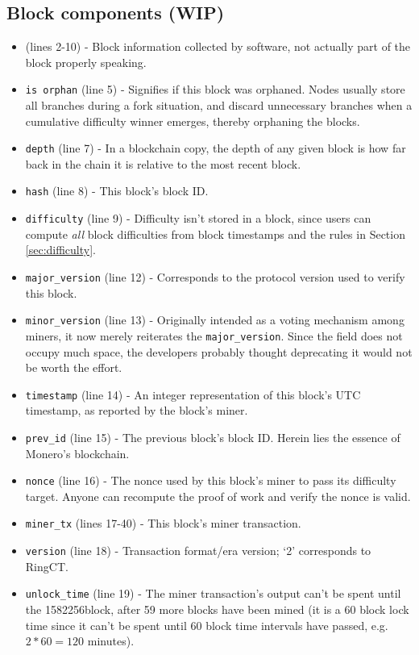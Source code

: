 \begin{appendices}
\section*{Block components (WIP)}

\begin{itemize}
	\item (lines 2-10) - Block information collected by software, not actually part of the block properly speaking.
    \item {\tt is orphan} (line 5) - Signifies if this block was orphaned. Nodes usually store all branches during a fork situation, and discard unnecessary branches when a cumulative difficulty winner emerges, thereby orphaning the blocks.
    \item {\tt depth} (line 7) - In a blockchain copy, the depth of any given block is how far back in the chain it is relative to the most recent block.
    \item {\tt hash} (line 8) - This block's block ID.
    \item {\tt difficulty} (line 9) - Difficulty isn't stored in a block, since users can compute {\em all} block difficulties from block timestamps and the rules in Section \ref{sec:difficulty}.
    \item {\tt major\_version} (line 12) - Corresponds to the protocol version used to verify this block.
    \item {\tt minor\_version} (line 13) - Originally intended as a voting mechanism among miners, it now merely reiterates the {\tt major\_version}. Since the field does not occupy much space, the developers probably thought deprecating it would not be worth the effort.
    \item {\tt timestamp} (line 14) - An integer representation of this block's UTC timestamp, as reported by the block's miner.
    \item {\tt prev\_id} (line 15) - The previous block's block ID. Herein lies the essence of Monero's blockchain.
    \item {\tt nonce} (line 16) - The nonce used by this block's miner to pass its difficulty target. Anyone can recompute the proof of work and verify the nonce is valid.
    \item {\tt miner\_tx} (lines 17-40) - This block's miner transaction.
    \item {\tt version} (line 18) - Transaction format/era version; `2' corresponds to RingCT.
    \item {\tt unlock\_time} (line 19) - The miner transaction's output can't be spent until the 1582256\nth block, after 59 more blocks have been mined (it is a 60 block lock time since it can't be spent until 60 block time intervals have passed, e.g.\ $2*60 = 120$ minutes).

\end{itemize}
\end{appendices}
